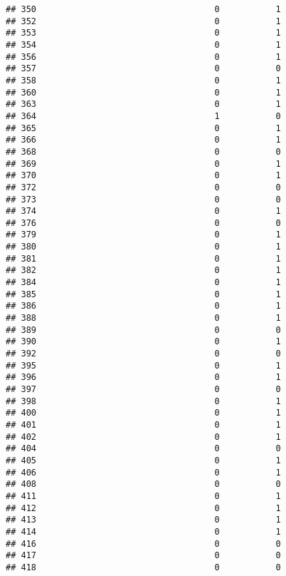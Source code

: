 \documentclass[
]{article}
\begin{document}
\begin{verbatim}
## 350                                   0           1
## 352                                   0           1
## 353                                   0           1
## 354                                   0           1
## 356                                   0           1
## 357                                   0           0
## 358                                   0           1
## 360                                   0           1
## 363                                   0           1
## 364                                   1           0
## 365                                   0           1
## 366                                   0           1
## 368                                   0           0
## 369                                   0           1
## 370                                   0           1
## 372                                   0           0
## 373                                   0           0
## 374                                   0           1
## 376                                   0           0
## 379                                   0           1
## 380                                   0           1
## 381                                   0           1
## 382                                   0           1
## 384                                   0           1
## 385                                   0           1
## 386                                   0           1
## 388                                   0           1
## 389                                   0           0
## 390                                   0           1
## 392                                   0           0
## 395                                   0           1
## 396                                   0           1
## 397                                   0           0
## 398                                   0           1
## 400                                   0           1
## 401                                   0           1
## 402                                   0           1
## 404                                   0           0
## 405                                   0           1
## 406                                   0           1
## 408                                   0           0
## 411                                   0           1
## 412                                   0           1
## 413                                   0           1
## 414                                   0           1
## 416                                   0           0
## 417                                   0           0
## 418                                   0           0

\end{verbatim}
\end{document}
